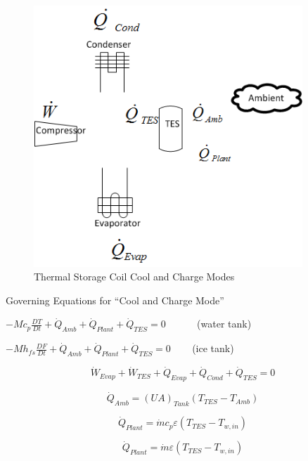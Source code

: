 \begin{figure}[hbtp] %
\centering
\includegraphics[width=0.9\textwidth, height=0.9\textheight, keepaspectratio=true]{media/image4309.png}
\caption{Thermal Storage Coil Cool and Charge Modes \protect \label{fig:thermal-storage-coil-cool-and-charge-modes}}
\end{figure}

Governing Equations for ``Cool and Charge Mode''

\(- M{c_p}\frac{{DT}}{{Dt}} + {\dot Q_{Amb}} + {\dot Q_{Plant}} + {\dot Q_{TES}} = 0\) ~~~~~ (water tank)

\(- M{h_{fs}}\frac{{DF}}{{Dt}} + {\dot Q_{Amb}} + {\dot Q_{Plant}} + {\dot Q_{TES}} = 0\) ~~~ (ice tank)

\begin{equation}
{\dot W_{Evap}} + {\dot W_{TES}} + {\dot Q_{Evap}} + {\dot Q_{Cond}} + {\dot Q_{TES}} = 0
\end{equation}

\begin{equation}
{\dot Q_{Amb}} = {\left( {UA} \right)_{Tank}}\left( {{T_{TES}} - {T_{Amb}}} \right)
\end{equation}

\begin{equation}
  {\dot Q_{Plant}} = \dot m{c_p}\varepsilon \left( {{T_{TES}} - {T_{w,in}}} \right)
\end{equation}

\begin{equation}
  {\dot Q_{Plant}} = \dot m\varepsilon \left( {{T_{TES}} - {T_{w,in}}} \right)
\end{equation}

